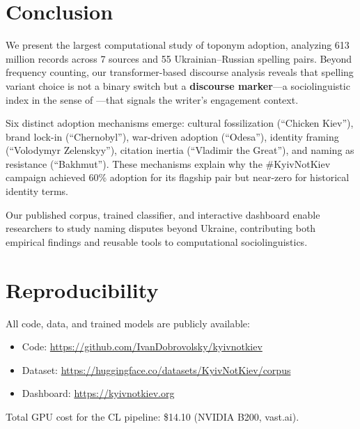 \documentclass{article}
\begin{document}
\section{Conclusion}
\label{sec:conclusion}

We present the largest computational study of toponym adoption, analyzing 613 million records across 7 sources and 55 Ukrainian--Russian spelling pairs. Beyond frequency counting, our transformer-based discourse analysis reveals that spelling variant choice is not a binary switch but a \textbf{discourse marker}---a sociolinguistic index in the sense of \citet{eckert-2008}---that signals the writer's engagement context.

Six distinct adoption mechanisms emerge: cultural fossilization (``Chicken Kiev''), brand lock-in (``Chernobyl''), war-driven adoption (``Odesa''), identity framing (``Volodymyr Zelenskyy''), citation inertia (``Vladimir the Great''), and naming as resistance (``Bakhmut''). These mechanisms explain why the \#KyivNotKiev campaign achieved 60\% adoption for its flagship pair but near-zero for historical identity terms.

Our published corpus, trained classifier, and interactive dashboard enable researchers to study naming disputes beyond Ukraine, contributing both empirical findings and reusable tools to computational sociolinguistics.

\section*{Reproducibility}

All code, data, and trained models are publicly available:
\begin{itemize}
\item Code: \url{https://github.com/IvanDobrovolsky/kyivnotkiev}
\item Dataset: \url{https://huggingface.co/datasets/KyivNotKiev/corpus}
\item Dashboard: \url{https://kyivnotkiev.org}
\end{itemize}

Total GPU cost for the CL pipeline: \$14.10 (NVIDIA B200, vast.ai).


\end{document}

